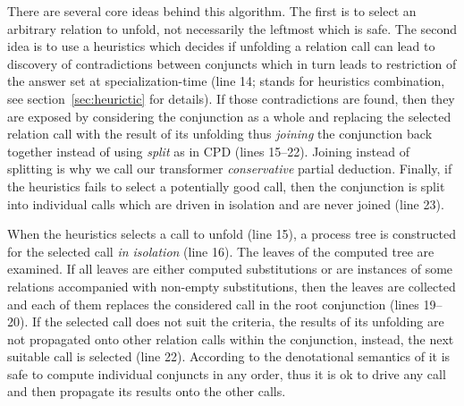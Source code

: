 
There are several core ideas behind this algorithm.
The first is to select an arbitrary relation to unfold, not necessarily the leftmost which is safe.
The second idea is to use a heuristics which decides if unfolding a relation call can lead to discovery of contradictions between conjuncts which in turn leads to restriction of the answer set at specialization-time (line 14;  stands for heuristics combination, see section~\ref{sec:heurictic} for details).
If those contradictions are found, then they are exposed by considering the conjunction as a whole and replacing the selected relation call with the result of its unfolding thus \emph{joining} the conjunction back together instead of using \emph{split} as in CPD (lines 15--22).
Joining instead of splitting is why we call our transformer \emph{conservative} partial deduction.
Finally, if the heuristics fails to select a potentially good call, then the conjunction is split into individual calls which are driven in isolation and are never joined (line 23).

When the heuristics selects a call to unfold (line 15), a process tree is constructed for the selected call \emph{in isolation} (line 16).
The leaves of the computed tree are examined.
If all leaves are either computed substitutions or are instances of some relations accompanied with non-empty substitutions, then the leaves are collected and each of them replaces the considered call in the root conjunction (lines 19--20).
If the selected call does not suit the criteria, the results of its unfolding are not propagated onto other relation calls within the conjunction, instead, the next suitable call is selected (line 22).
According to the denotational semantics of \mk it is safe to compute individual conjuncts in any order, thus it is ok to drive any call and then propagate its results onto the other calls.


